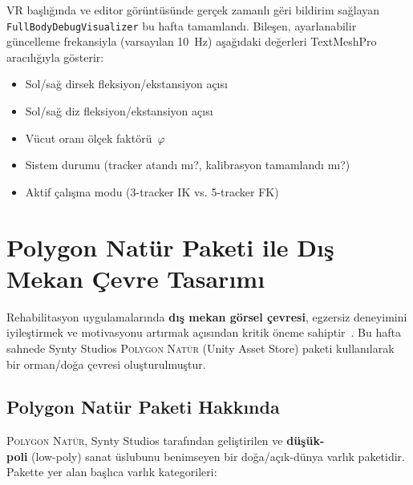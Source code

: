 \documentclass[11pt,a4paper]{article}
\begin{document}
VR ba\c{s}l{\i}\u{g}{\i}nda ve editor g\"or\"unt\"us\"unde
ger\c{c}ek zamanl{\i} g\"eri bildirim sa\u{g}layan
\texttt{FullBodyDebugVisualizer} bu hafta tamamland{\i}.
Bile\c{s}en, ayarlanabilir g\"uncelleme frekansiyla
(varsay{\i}lan 10~Hz) a\c{s}a\u{g}{\i}daki de\u{g}erleri TextMeshPro
arac{\i}l{\i}\u{g}{\i}yla g\"osterir:

\begin{itemize}[nosep]
    \item Sol/sa\u{g} dirsek fleksiyon/ekstansiyon a\c{c}{\i}s{\i}
    \item Sol/sa\u{g} diz fleksiyon/ekstansiyon a\c{c}{\i}s{\i}
    \item V\"ucut oran{\i} \"ol\c{c}ek fakt\"or\"u~$\varphi$
    \item Sistem durumu (tracker atand{\i} m{\i}?, kalibrasyon tamamland{\i} m{\i}?)
    \item Aktif \c{c}al{\i}\c{s}ma modu (3-tracker IK vs. 5-tracker FK)
\end{itemize}

\section{Polygon Nat\"ur Paketi ile D{\i}\c{s} Mekan \c{C}evre Tasar{\i}m{\i}}
\label{sec:cevre}

Rehabilitasyon uygulamalar{\i}nda \textbf{d{\i}\c{s} mekan
g\"orsel \c{c}evresi}, egzersiz deneyimini iyile\c{s}tirmek ve
motivasyonu art{\i}rmak a\c{c}{\i}s{\i}ndan kritik \"oneme
sahiptir~\cite{adamovich2009,mirelman2011}. Bu hafta sahnede
Synty Studios \textsc{Polygon Nat\"ur} (Unity Asset Store) paketi
kullan{\i}larak bir orman/do\u{g}a \c{c}evresi olu\c{s}turulmu\c{s}tur.

\subsection{Polygon Nat\"ur Paketi Hakk{\i}nda}

\textsc{Polygon Nat\"ur}, Synty Studios taraf{\i}ndan geli\c{s}tirilen
ve \textbf{d\"u\c{s}\"uk-\\poli} (low-poly) sanat \"{u}slubunu benimseyen
bir do\u{g}a/a\c{c}{\i}k-d\"unya varlık paketidir. Pakette yer
alan ba\c{s}l{\i}ca varlık kategorileri:
\end{document}
